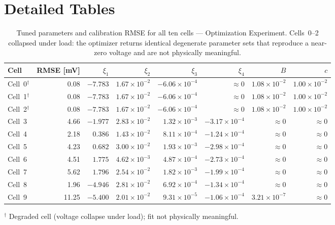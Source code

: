 
\chapter{Detailed Tables}

\label{app:tables}

\begin{table}[H]
    \centering
    \caption{Tuned parameters and calibration RMSE for all ten cells ---
             Optimization Experiment. Cells~0--2 collapsed under load: the
             optimizer returns identical degenerate parameter sets that
             reproduce a near-zero voltage and are not physically meaningful.}
    \label{tab:params-opt}
    \small
    \begin{tabular}{lrrrrrrr}
        \toprule
        Cell & RMSE [mV] & $\xi_1$ & $\xi_2$ & $\xi_3$ & $\xi_4$ & $B$ & $c$ \\
        \midrule
        Cell~0$^{\dagger}$ & 0.08 & $-7.783$ & $1.67\!\times\!10^{-2}$ & $-6.06\!\times\!10^{-4}$ & $\approx 0$ & $1.08\!\times\!10^{-2}$ & $1.00\!\times\!10^{-2}$ \\
        Cell~1$^{\dagger}$ & 0.08 & $-7.783$ & $1.67\!\times\!10^{-2}$ & $-6.06\!\times\!10^{-4}$ & $\approx 0$ & $1.08\!\times\!10^{-2}$ & $1.00\!\times\!10^{-2}$ \\
        Cell~2$^{\dagger}$ & 0.08 & $-7.783$ & $1.67\!\times\!10^{-2}$ & $-6.06\!\times\!10^{-4}$ & $\approx 0$ & $1.08\!\times\!10^{-2}$ & $1.00\!\times\!10^{-2}$ \\
        Cell~3 &  4.66 & $-1.977$ & $2.83\!\times\!10^{-2}$ & $1.32\!\times\!10^{-3}$  & $-3.17\!\times\!10^{-4}$ & $\approx 0$ & $\approx 0$ \\
        Cell~4 &  2.18 & $ 0.386$ & $1.43\!\times\!10^{-2}$ & $8.11\!\times\!10^{-4}$  & $-1.24\!\times\!10^{-4}$ & $\approx 0$ & $\approx 0$ \\
        Cell~5 &  4.23 & $ 0.682$ & $3.00\!\times\!10^{-2}$ & $1.93\!\times\!10^{-3}$  & $-2.98\!\times\!10^{-4}$ & $\approx 0$ & $\approx 0$ \\
        Cell~6 &  4.51 & $ 1.775$ & $4.62\!\times\!10^{-3}$ & $4.87\!\times\!10^{-4}$  & $-2.73\!\times\!10^{-4}$ & $\approx 0$ & $\approx 0$ \\
        Cell~7 &  5.62 & $ 1.796$ & $2.54\!\times\!10^{-2}$ & $1.82\!\times\!10^{-3}$  & $-1.99\!\times\!10^{-4}$ & $\approx 0$ & $\approx 0$ \\
        Cell~8 &  1.96 & $-4.946$ & $2.81\!\times\!10^{-2}$ & $6.92\!\times\!10^{-4}$  & $-1.34\!\times\!10^{-4}$ & $\approx 0$ & $\approx 0$ \\
        Cell~9 & 11.25 & $-5.400$ & $2.01\!\times\!10^{-2}$ & $9.31\!\times\!10^{-5}$  & $-1.06\!\times\!10^{-4}$ & $3.21\!\times\!10^{-7}$ & $\approx 0$ \\
        \bottomrule
    \end{tabular}

    \medskip
    \footnotesize $^{\dagger}$ Degraded cell (voltage collapse under load); fit not physically meaningful.
\end{table}
